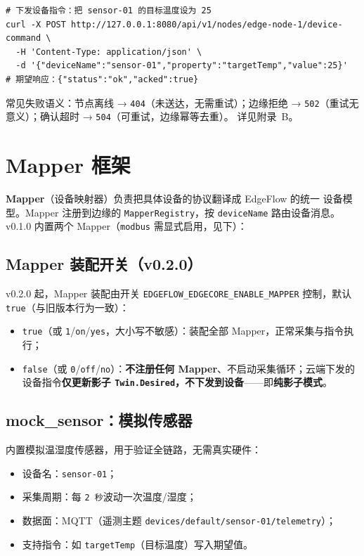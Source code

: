 \begin{lstlisting}
# 下发设备指令：把 sensor-01 的目标温度设为 25
curl -X POST http://127.0.0.1:8080/api/v1/nodes/edge-node-1/device-command \
  -H 'Content-Type: application/json' \
  -d '{"deviceName":"sensor-01","property":"targetTemp","value":25}'
# 期望响应：{"status":"ok","acked":true}
\end{lstlisting}

常见失败语义：节点离线 → \texttt{404}（未送达，无需重试）；边缘拒绝 →
\texttt{502}（重试无意义）；确认超时 → \texttt{504}（可重试，边缘幂等去重）。
详见附录~B。

\section{Mapper 框架}

\textbf{Mapper}（设备映射器）负责把具体设备的协议翻译成 EdgeFlow 的统一
设备模型。Mapper 注册到边缘的 \texttt{MapperRegistry}，按
\texttt{deviceName} 路由设备消息。v0.1.0 内置两个 Mapper（\texttt{modbus} 需显式启用，见下）：

\subsection{Mapper 装配开关（v0.2.0）}

v0.2.0 起，Mapper 装配由开关 \texttt{EDGEFLOW\_EDGECORE\_ENABLE\_MAPPER}
控制，默认 \texttt{true}（与旧版本行为一致）：

\begin{itemize}
  \item \texttt{true}（或 \texttt{1}/\texttt{on}/\texttt{yes}，大小写不敏感）：装配全部 Mapper，正常采集与指令执行；
  \item \texttt{false}（或 \texttt{0}/\texttt{off}/\texttt{no}）：\textbf{不注册任何 Mapper}、不启动采集循环；云端下发的设备指令\textbf{仅更新影子 \texttt{Twin.Desired}，不下发到设备}——即\textbf{纯影子模式}。
\end{itemize}

\subsection{mock\_sensor：模拟传感器}

内置模拟温湿度传感器，用于验证全链路，无需真实硬件：

\begin{itemize}
  \item 设备名：\texttt{sensor-01}；
  \item 采集周期：每 \texttt{2 秒}波动一次温度/湿度；
  \item 数据面：MQTT（遥测主题 \texttt{devices/default/sensor-01/telemetry}）；
  \item 支持指令：如 \texttt{targetTemp}（目标温度）写入期望值。
\end{itemize}

